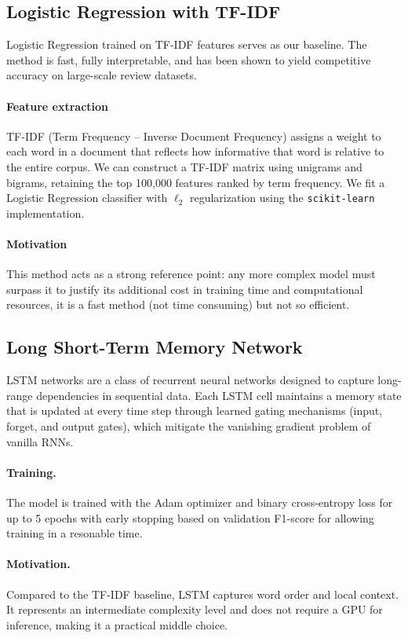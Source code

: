 \documentclass{article}
\begin{document}
\subsection{Logistic Regression with TF-IDF}

Logistic Regression trained on TF-IDF features serves as our baseline.
The method is fast, fully interpretable, and has been shown to yield competitive
accuracy on large-scale review datasets.

\paragraph{Feature extraction}
TF-IDF (Term Frequency – Inverse Document Frequency) assigns a weight to each
word in a document that reflects how informative that word is relative to the
entire corpus.
We can construct a TF-IDF matrix using unigrams and bigrams, retaining the top
100,000 features ranked by term frequency.
We fit a Logistic Regression classifier with $\ell_2$ regularization using the
\texttt{scikit-learn} implementation.

\paragraph{Motivation}
This method acts as a strong reference point: any more complex model must
surpass it to justify its additional cost in training time and computational
resources, it is a fast method (not time consuming) but not so efficient.

\subsection{Long Short-Term Memory Network}

LSTM networks are a class of recurrent neural
networks designed to capture long-range dependencies in sequential data.
Each LSTM cell maintains a memory state that is updated at every time step
through learned gating mechanisms (input, forget, and output gates), which
mitigate the vanishing gradient problem of vanilla RNNs.

\paragraph{Training.}
The model is trained with the Adam optimizer and
binary cross-entropy loss for up to 5 epochs with early stopping based on
validation F1-score for allowing training in a resonable time.

\paragraph{Motivation.}
Compared to the TF-IDF baseline, LSTM captures word order and local context.
It represents an intermediate complexity level and does not require a GPU
for inference, making it a practical middle choice.
\end{document}
